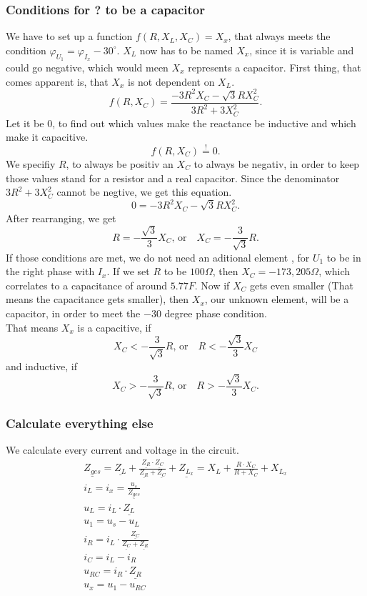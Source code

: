 \documentclass[a4paper]{article}
\begin{document}
\subsubsection{Conditions for ? to be a capacitor}
We have to set up a function $f(R, X_{L}, X_{C}) = X_x$, that always meets the condition
$\varphi_{U_{1}} = \varphi_{I_{x}} - 30^{\circ}$. $X_L$ now has to be named  $X_{x}$, since it is
variable and could go negative, which would meen $X_{x}$ represents a capacitor. First thing, that
comes apparent is, that $X_{x}$ is not dependent on $X_{L}$.
\[
  f(R, X_{C}) =  \frac{-3R^2X_C -\sqrt{3}RX_C^2}{3R^2 + 3X_C^2} 
.\] 
Let it be $0$, to find out which values make the reactance be inductive and which make it
capacitive. 
\[
  f(R,X_{C}) \overset{!}{=} 0
.\] 
We specifiy $R$, to always be positiv an $X_{C}$ to always be negativ, in order to keep those values
stand for a resistor and a real capacitor. Since the denominator $3R^2 + 3X_{C}^2$ cannot be
negtive, we get this equation.
\[
  0 = -3R^2X_{C} - \sqrt{3}RX_{C}^2
.\]
After rearranging, we get
\[
  R = -\frac{\sqrt{3}}{3} X_{C},\, \text{or} \quad X_{C} = -\frac{3}{\sqrt{3}} R
.\] 
If those conditions are met, we do not need an aditional element , for $U_{1}$ to be in the right
phase with $I_{x}$. If we set $R$ to be $100 \Omega$,
then $X_{C} = -173,205\Omega$, which correlates to a capacitance of around $5.77 F$. Now if $X_{C}$ gets
even smaller (That means the capacitance gets smaller), then $X_{x}$, our unknown element, will be a
capacitor, in order to meet the $-30$ degree phase condition. \\
That means $X_{x}$ is a capacitive, if
\[
  X_{C} < -\frac{3}{\sqrt{3}} R,\, \text{or} \quad R < -\frac{\sqrt{3}}{3}X_{C}
\] 
and inductive, if
\[
  X_{C} > -\frac{3}{\sqrt{3}} R,\, \text{or} \quad R > -\frac{\sqrt{3}}{3}X_{C}
.\] 
\clearpage
\subsubsection{Calculate everything else}
We calculate every current and voltage in the circuit.
\begin{align*}
	\underline{Z_{ges}} = \underline{Z_L} + \frac{\underline{Z_R} \cdot \underline{Z_C}}{\underline{Z_R} + \underline{Z_C}} + \underline{Z_{L_x}}
	= X_L + \frac{R \cdot X_C}{R + X_C} + X_{L_x}\\
	i_L = i_x = \frac{u_s}{\underline{Z_{ges}}}\\
	u_L = i_L \cdot \underline{Z_L}\\
	u_1 = u_s - u_L\\
	i_R = i_L \cdot \frac{\underline{Z_C}}{\underline{Z_C} + \underline{Z_R}}\\
	i_C = i_L - i_R\\
	u_{RC} = i_R \cdot \underline{Z_R}\\
	u_x = u_1 - u_{RC}\\
\end{align*}
\end{document}
